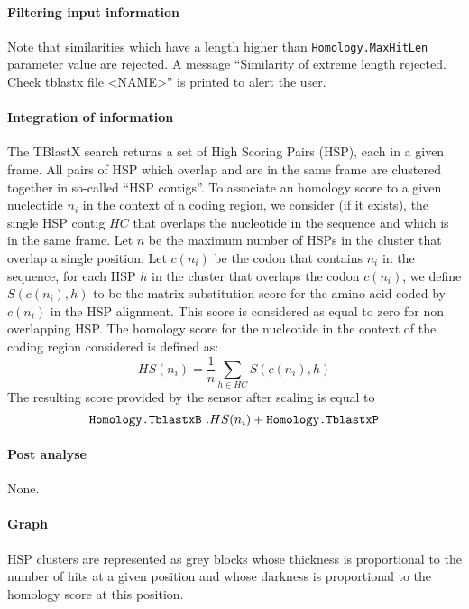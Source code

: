 \paragraph{Filtering input information}

Note that similarities which have a length higher than 
\texttt{Homology.MaxHitLen} parameter value are rejected. A message 
``Similarity of extreme length rejected. Check tblastx file <NAME>'' 
is printed to alert the user.

\paragraph{Integration of information}

The TBlastX search returns a set of High Scoring Pairs (HSP), each in
a given frame. All pairs of HSP which overlap and are in the same
frame are clustered together in so-called ``HSP contigs''. To
associate an homology score to a given nucleotide $n_i$ in the context
of a coding region, we consider (if it exists), the single HSP contig
$HC$ that overlaps the nucleotide in the sequence and which is in the
same frame. Let $n$ be the maximum number of HSPs in the cluster that
overlap a single position. Let $c(n_i)$ be the codon that contains
$n_i$ in the sequence, for each HSP $h$ in the cluster that overlaps
the codon $c(n_i)$, we define $S(c(n_i),h)$ to be the matrix
substitution score for the amino acid coded by $c(n_i)$ in the HSP
alignment. This score is considered as equal to zero for non
overlapping HSP. The homology score for the nucleotide in the context
of the coding region considered is defined as:
\[HS(n_i) = \frac{1}{n}\sum_{h\in HC} S(c(n_i),h)\]
The resulting score provided by the sensor after scaling is equal to
\[\mbox{\texttt{Homology.TblastxB}}\ . HS(n_i) + \mbox{\texttt{Homology.TblastxP}}\]

\paragraph{Post analyse}

None.

\paragraph{Graph}

HSP clusters are represented as grey blocks whose thickness is
proportional to the number of hits at a given position and whose
darkness is proportional to the homology score at this position.
